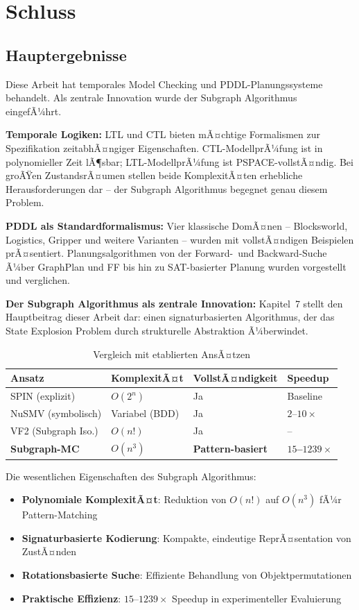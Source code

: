 ﻿\documentclass[a4paper,12pt]{article}
\theoremstyle{definition}
\begin{document}
\section{Schluss}

\subsection{Hauptergebnisse}

Diese Arbeit hat temporales Model Checking und PDDL-Planungssysteme behandelt. Als zentrale Innovation wurde der Subgraph Algorithmus eingefÃ¼hrt.

\textbf{Temporale Logiken:} LTL und CTL bieten mÃ¤chtige Formalismen zur Spezifikation zeitabhÃ¤ngiger Eigenschaften. CTL-ModellprÃ¼fung ist in polynomieller Zeit lÃ¶sbar; LTL-ModellprÃ¼fung ist PSPACE-vollstÃ¤ndig. Bei groÃŸen ZustandsrÃ¤umen stellen beide KomplexitÃ¤ten erhebliche Herausforderungen dar -- der Subgraph Algorithmus begegnet genau diesem Problem.

\textbf{PDDL als Standardformalismus:} Vier klassische DomÃ¤nen -- Blocksworld, Logistics, Gripper und weitere Varianten -- wurden mit vollstÃ¤ndigen Beispielen prÃ¤sentiert. Planungsalgorithmen von der Forward-~und Backward-Suche Ã¼ber GraphPlan und FF bis hin zu SAT-basierter Planung wurden vorgestellt und verglichen.

\textbf{Der Subgraph Algorithmus als zentrale Innovation:} Kapitel~7 stellt den Hauptbeitrag dieser Arbeit dar: einen signaturbasierten Algorithmus, der das State Explosion Problem durch strukturelle Abstraktion Ã¼berwindet.

\begin{table}[h]
	\centering
	\caption{Vergleich mit etablierten AnsÃ¤tzen}
	\label{tab:final_comparison}
	\begin{tabular}{llll}
		\toprule
		Ansatz & KomplexitÃ¤t & VollstÃ¤ndigkeit & Speedup \\
		\midrule
		SPIN (explizit) & $O(2^n)$ & Ja & Baseline \\
		NuSMV (symbolisch) & Variabel (BDD) & Ja & $2$--$10\times$ \\
		VF2 (Subgraph Iso.) & $O(n!)$ & Ja & -- \\
		\textbf{Subgraph-MC} & \textbf{$O(n^3)$} & \textbf{Pattern-basiert} & \textbf{$15$--$1239\times$} \\
		\bottomrule
	\end{tabular}
\end{table}

Die wesentlichen Eigenschaften des Subgraph Algorithmus:
\begin{itemize}
	\item[-] \textbf{Polynomiale KomplexitÃ¤t}: Reduktion von $O(n!)$ auf $O(n^3)$ fÃ¼r Pattern-Matching
	\item[-] \textbf{Signaturbasierte Kodierung}: Kompakte, eindeutige ReprÃ¤sentation von ZustÃ¤nden
	\item[-] \textbf{Rotationsbasierte Suche}: Effiziente Behandlung von Objektpermutationen
	\item[-] \textbf{Praktische Effizienz}: $15$--$1239\times$ Speedup in experimenteller Evaluierung
\end{itemize}
\end{document}
